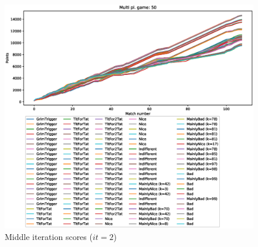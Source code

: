 \documentclass[journal,10pt,twoside]{IEEEtran}
\begin{document}
\begin{figure}[!ht]
    \centering
    \includegraphics[width=1\columnwidth]{../img/ripdmp-incr/ripdmp-scores-increasing-pop-50-r2}
    \caption{Middle iteration scores ($it=2$)}
    \label{fig:incrMI}
\end{figure}
\end{document}
